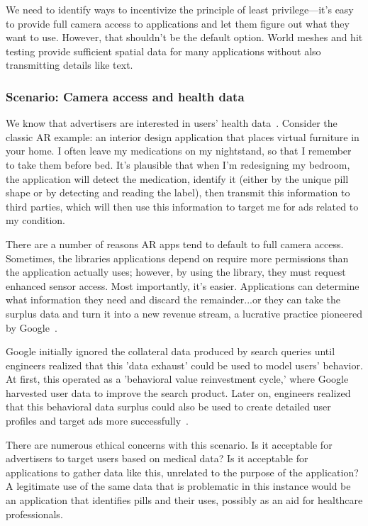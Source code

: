 We need to identify ways to incentivize the principle of least privilege---it's easy to provide full camera access to applications and let them figure out what they want to use. However, that shouldn't be the default option. World meshes and hit testing provide sufficient spatial data for many applications without also transmitting details like text.

\subsubsection{Scenario: Camera access and health data}\label{sec:data:world:camera}

We know that advertisers are interested in users' health data~\cite{jeong2019insurers}. Consider the classic AR example: an interior design application that places virtual furniture in your home. I often leave my medications on my nightstand, so that I remember to take them before bed. It's plausible that when I'm redesigning my bedroom, the application will detect the medication, identify it (either by the unique pill shape or by detecting and reading the label), then transmit this information to third parties, which will then use this information to target me for ads related to my condition.

There are a number of reasons AR apps tend to default to full camera access. Sometimes, the libraries applications depend on require more permissions than the application actually uses; however, by using the library, they must request enhanced sensor access. Most importantly, it's easier. Applications can determine what information they need and discard the remainder...or they can take the surplus data and turn it into a new revenue stream, a lucrative practice pioneered by Google~\cite{zuboff2019age}.

Google initially ignored the collateral data produced by search queries until engineers realized that this 'data exhaust' could be used to model users' behavior. At first, this operated as a 'behavioral value reinvestment cycle,' where Google harvested user data to improve the search product. Later on, engineers realized that this behavioral data surplus could also be used to create detailed user profiles and target ads more successfully~\cite{patent2003targetedad}.

There are numerous ethical concerns with this scenario. Is it acceptable for advertisers to target users based on medical data? Is it acceptable for applications to gather data like this, unrelated to the purpose of the application?  A legitimate use of the same data that is problematic in this instance would be an application that identifies pills and their uses, possibly as an aid for healthcare professionals.

